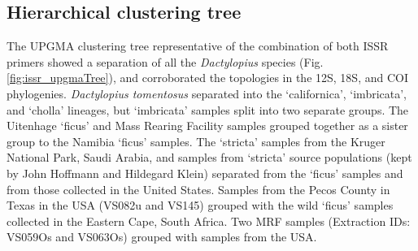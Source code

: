 
\subsection{Hierarchical clustering tree}
The UPGMA clustering tree representative of the combination of both ISSR primers showed a separation of all the \textit{Dactylopius} species (Fig. \ref{fig:issr_upgmaTree}), and corroborated the topologies in the 12S, 18S, and COI phylogenies. \textit{Dactylopius tomentosus} separated into the `californica', `imbricata', and `cholla' lineages, but `imbricata' samples split into two separate groups. The Uitenhage `ficus' and Mass Rearing Facility samples grouped together as a sister group to the Namibia `ficus' samples. The `stricta' samples from the Kruger National Park, Saudi Arabia, and samples from `stricta' source populations (kept by John Hoffmann and Hildegard Klein) separated from the `ficus' samples and from those collected in the United States. Samples from the Pecos County in Texas in the USA (VS082u and VS145) grouped with the wild `ficus' samples collected in the Eastern Cape, South Africa. Two MRF samples (Extraction IDs: VS059Os and VS063Os) grouped with samples from the USA.

